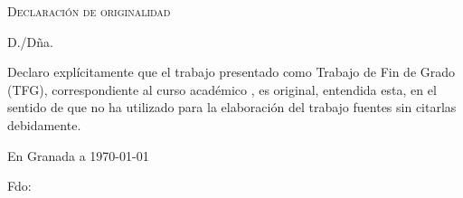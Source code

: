 \thispagestyle{empty}

\hfill\vfill

\noindent\textsc{Declaración de originalidad}\\\bigskip

\noindent D./Dña. \myName \medskip

\noindent Declaro explícitamente que el trabajo presentado como Trabajo de Fin de Grado (TFG), correspondiente al curso académico \myYear, es original, entendida esta, en el sentido de que no ha utilizado para la elaboración del trabajo fuentes sin citarlas debidamente.
\medskip

\noindent En Granada a \today 
\begin{flushleft} 
\noindent Fdo: \myName 

\end{flushleft}

\vfill

\cleardoublepage
\endinput
